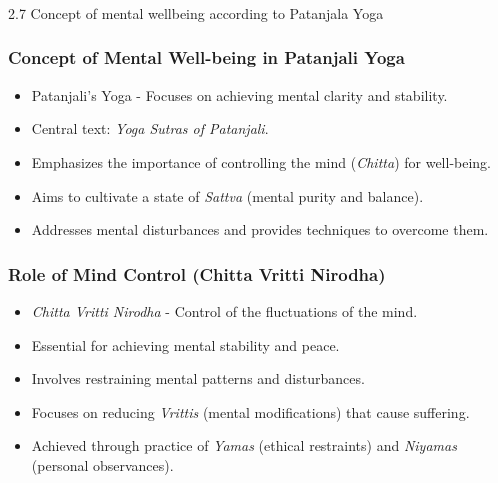 

\begin{frame}[fragile]\frametitle{}
\begin{center}
{\Large 2.7  Concept of mental wellbeing according to Patanjala Yoga}
\end{center}
\end{frame}

\begin{frame}[fragile]\frametitle{Concept of Mental Well-being in Patanjali Yoga}

      \begin{itemize}
		\item Patanjali's Yoga - Focuses on achieving mental clarity and stability.
		\item Central text: \textit{Yoga Sutras of Patanjali}.
		\item Emphasizes the importance of controlling the mind (\textit{Chitta}) for well-being.
		\item Aims to cultivate a state of \textit{Sattva} (mental purity and balance).
		\item Addresses mental disturbances and provides techniques to overcome them.
	  \end{itemize}

\end{frame}

\begin{frame}[fragile]\frametitle{Role of Mind Control (Chitta Vritti Nirodha)}

      \begin{itemize}
		\item \textit{Chitta Vritti Nirodha} - Control of the fluctuations of the mind.
		\item Essential for achieving mental stability and peace.
		\item Involves restraining mental patterns and disturbances.
		\item Focuses on reducing \textit{Vrittis} (mental modifications) that cause suffering.
		\item Achieved through practice of \textit{Yamas} (ethical restraints) and \textit{Niyamas} (personal observances).
	  \end{itemize}

\end{frame}

